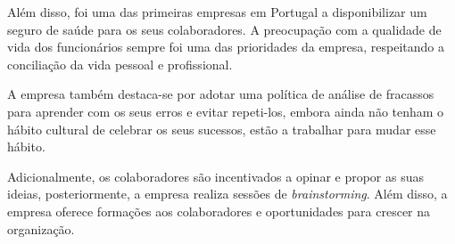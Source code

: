 Além disso, foi uma das primeiras empresas em Portugal a disponibilizar um seguro de saúde para os seus colaboradores. A preocupação com a qualidade de vida dos funcionários sempre foi uma das prioridades da empresa, respeitando a conciliação da vida pessoal e profissional.

A empresa também destaca-se por adotar uma política de análise de fracassos para aprender com os seus erros e evitar repeti-los, embora ainda não tenham o hábito cultural de celebrar os seus sucessos, estão a trabalhar para mudar esse hábito.

Adicionalmente, os colaboradores são incentivados a opinar e propor as suas ideias, posteriormente, a empresa realiza sessões de \textit{brainstorming}. Além disso, a empresa oferece formações aos colaboradores e oportunidades para crescer na organização.

